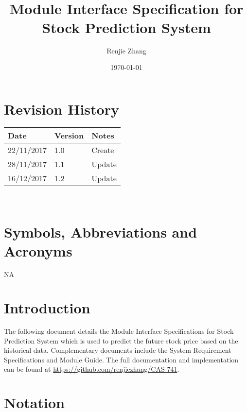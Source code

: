 \documentclass[12pt, titlepage]{article}
\begin{document}
\title{Module Interface Specification for Stock Prediction System}

\author{Renjie Zhang}

\date{\today}

\maketitle


\section{Revision History}

\begin{tabularx}{\textwidth}{p{3cm}p{2cm}X}
\toprule {\bf Date} & {\bf Version} & {\bf Notes}\\
\midrule
22/11/2017 & 1.0 & Create\\
28/11/2017 & 1.1 & Update\\
16/12/2017 & 1.2 & Update\\
\bottomrule
\end{tabularx}

~\newpage

\section{Symbols, Abbreviations and Acronyms}

NA

\newpage

\tableofcontents

\newpage


\section{Introduction}

The following document details the Module Interface Specifications for
Stock Prediction System which is used to predict the future stock price based on the historical data. Complementary documents include the System Requirement Specifications
and Module Guide. The full documentation and implementation can be
found at \url{https://github.com/renjiezhang/CAS-741}.\\

\section{Notation}
\end{document}
